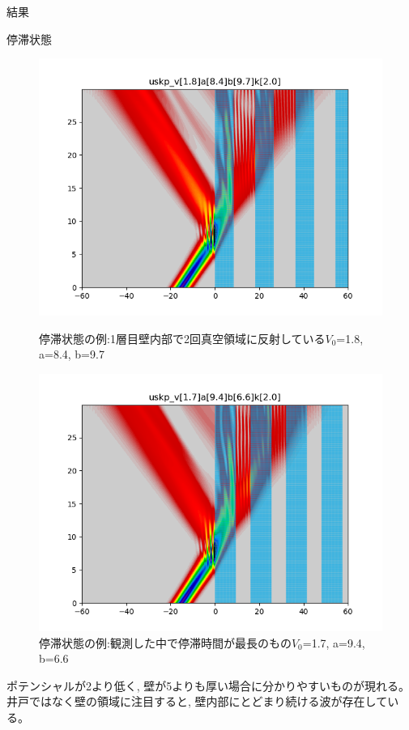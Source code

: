 \documentclass[a4paper, lualatex]{bxjsarticle}
\begin{document}
\begin{section}{結果}
\begin{subsection}{停滞状態\label{teitais}}
\begin{figure}[h]
\begin{minipage}{0.5\hsize}
                \centering
                \includegraphics[width=0.9\hsize]{teitai3.png}
                \caption{停滞状態の例:1層目壁内部で2回真空領域に反射している$V_0$=1.8, a=8.4, b=9.7}
                \label{hanshamiyasui}
            \end{minipage}
            \begin{minipage}{0.5\hsize}
                \centering
                \includegraphics[width=0.9\hsize]{teitai4.png}
                \caption{停滞状態の例:観測した中で停滞時間が最長のもの$V_0$=1.7, a=9.4, b=6.6}
                \label{teitai3}
            \end{minipage}
        \end{figure}
        \par ポテンシャルが2より低く, 壁が5よりも厚い場合に分かりやすいものが現れる。井戸ではなく壁の領域に注目すると, 壁内部にとどまり続ける波が存在している。

\end{subsection}
\end{section}
\end{document}
